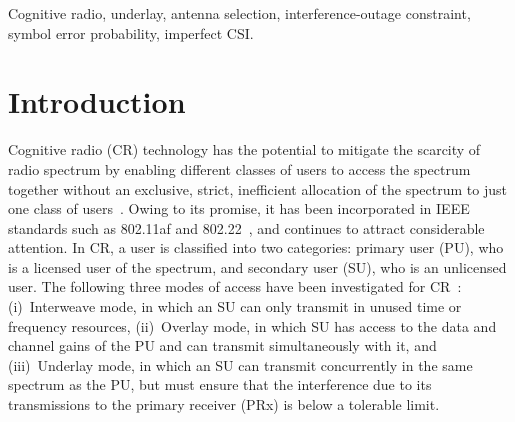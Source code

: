 \documentclass[12pt,draftcls,peerreview,onecolumn]{IEEEtran}
\begin{document}
\begin{IEEEkeywords}
Cognitive radio, underlay, antenna selection, interference-outage constraint, symbol error probability, imperfect CSI.
\end{IEEEkeywords}

\IEEEpeerreviewmaketitle



\section{Introduction}
\label{sec:intro}

Cognitive radio (CR) technology has the potential to mitigate the scarcity of radio spectrum by enabling different classes of users to access the spectrum together without an exclusive, strict, inefficient allocation of the spectrum to just one class of users~\cite{Goldsmith_2009_PIEEE}. Owing to its promise, it has been incorporated in IEEE standards such as 802.11af and 802.22~\cite{Sherman_2008_TCMAG}, and continues to attract considerable attention. In CR, a user is classified into two categories: primary user (PU), who is a licensed user of the spectrum, and secondary user (SU), who is an unlicensed user. The following three modes of access have been investigated for CR~\cite{Goldsmith_2009_PIEEE}: (i)~Interweave mode, in which an SU can only transmit in unused time or frequency resources, (ii)~Overlay mode, in which SU has access to the data and channel gains of the  PU and can transmit simultaneously with it, and (iii)~Underlay mode, in which an SU can transmit concurrently in the same spectrum as the PU, but must ensure that the interference due to its transmissions to the primary receiver (PRx) is below a tolerable limit. 




\end{document}
